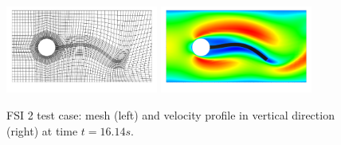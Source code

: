 \documentclass[smallextended]{svjour3}       %
\numberwithin{equation}{section}
\begin{document}
\begin{figure}[h]
\centering
{\includegraphics[width=5cm]{Pictures/visit_fsi_2_CNn_t_2e-2_global_3_biharmonic_mesh8070_scale.png}}
{\includegraphics[width=5cm]{Pictures/visit_fsi_2_CNn_t_2e-2_global_3_biharmonic_x_velo8070_scale.png}}
\caption{FSI 2 test case: mesh (left) and velocity profile in vertical 
direction (right) at time $t=16.14s$.}
\label{res:fsi_2_mesh_and_x_velo}
\end{figure}
\end{document}
